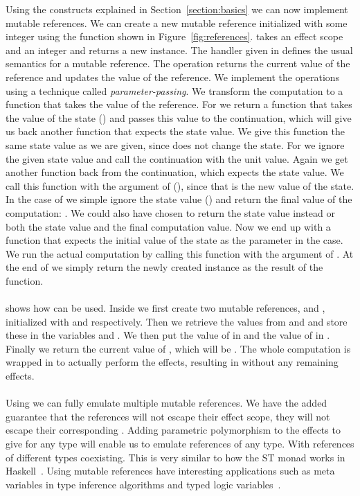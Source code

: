 Using the constructs explained in Section~\ref{section:basics} we can now implement mutable references.
We can create a new mutable reference initialized with some integer using the  function shown in Figure~\ref{fig:references}.
 takes an effect scope and an integer and returns a new  instance.
The handler given in  defines the usual semantics for a mutable reference. 
The  operation returns the current value of the reference and  updates the value of the reference.
We implement the operations using a technique called \emph{parameter-passing}\cite{algtutorial}.
We transform the computation to a function that takes the value of the reference.
 For  we return a function that takes the value of the state () and passes this value to the continuation, which will give us back another function that expects the state value. We give this function the same state value as we are given, since  does not change the state.
 For  we ignore the given state value and call the continuation with the unit value.
 Again we get another function back from the continuation, which expects the state value.
 We call this function with the argument of  (), since that is the new value of the state.
 In the case of  we simple ignore the state value () and return the final value of the computation: .
 We could also have chosen to return the state value instead or both the state value and the final computation value.
 Now we end up with a function that expects the initial value of the state as the parameter  in the  case.
 We run the actual computation by calling this function with the  argument of .
 At the end of  we simply return the newly created instance as the result of the function.
\\\\
 shows how  can be used.
Inside  we first create two mutable references,  and , initialized with  and  respectively.
Then we retrieve the values from  and  and store these in the variables  and .
We then put the value of  in  and the value of  in .
Finally we return the current value of , which will be .
The whole computation is wrapped in  to actually perform the effects, resulting in  without any remaining effects.
\\\\
Using  we can fully emulate multiple mutable references.
We have the added guarantee that the references will not escape their effect scope, they will not escape their corresponding .
Adding parametric polymorphism to the effects to give  for any type  will enable us to emulate references of any type.
With references of different types coexisting.
This is very similar to how the ST monad works in Haskell~\cite{runst}.
Using mutable references have interesting applications such as meta variables in type inference algorithms and typed logic variables~\cite{typedlogic}.
\fi

